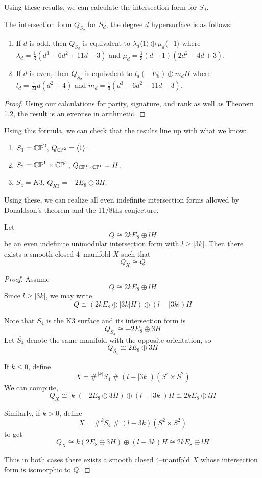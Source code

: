 \documentclass[12pt]{article}
\begin{document}
Using these results, we can calculate the intersection form for $S_d$. 
\begin{theorem}
    The intersection form $Q_{S_d}$ for $S_d$, the degree $d$ hypersurface is as follows: 
    \begin{enumerate}
        \item If $d$ is odd, then $Q_{S_d}$ is equivalent to $\lambda_d\langle 1 \rangle \oplus \mu_d\langle -1 \rangle$ where $\lambda_d = \frac{1}{3}(d^3 - 6d^2 + 11d - 3)$ and $\mu_d = \frac{1}{3}(d-1)(2d^2 - 4d+3)$.
        \item If $d$ is even, then $Q_{S_d}$ is equivalent to $l_d(-E_8) \oplus m_dH$ where $l_d = \frac{1}{24}d(d^2-4)$ and $m_d = \frac{1}{3}(d^3 - 6d^2 + 11d -3)$.
    \end{enumerate}     
\end{theorem}
\begin{proof}
    Using our calculations for parity, signature, and rank as well as Theorem 1.2, the result is an exercise in arithmetic. 
\end{proof}

Using this formula, we can check that the results line up with what we know:
\begin{enumerate}
    \item $S_1 = \mathbb{CP}^2$, $Q_{\mathbb{CP}^2} = \langle 1 \rangle$. 
    \item $S_2 = \mathbb{CP}^1 \times \mathbb{CP}^1$, $Q_{\mathbb{CP}^1 \times \mathbb{CP}^1} = H$.
    \item $S_4 = K3$, $Q_{K3} = -2E_8 \oplus 3H$. 
\end{enumerate}

Using these, we can realize all even indefinite intersection forms allowed by Donaldson's theorem and the 11/8ths conjecture. 

\begin{theorem}
Let 
\[ Q \cong 2kE_8 \oplus lH \]
be an even indefinite unimodular intersection form with $l \ge |3k|$. Then there exists a smooth closed $4$–manifold $X$ such that
\[ Q_X \cong Q \]
\end{theorem}

\begin{proof}
Assume
\[ Q \cong 2kE_8 \oplus lH \]
Since $l \ge |3k|$, we may write
\[ Q \cong (2kE_8 \oplus |3k|H) \oplus (l-|3k|)H  \]

Note that $S_4$ is the K3 surface and its intersection form is
\[ Q_{S_4} \cong -2E_8 \oplus 3H  \]
Let $\overline{S_4}$ denote the same manifold with the opposite orientation, so
\[ Q_{\overline{S_4}} \cong 2E_8 \oplus 3H \]

If $k \le 0$, define
\[ X = \#^{\,|k|} S_4 \;\#\; (l-|3k|)(S^2 \times S^2) \]
We can compute,
\[ Q_X \cong |k|(-2E_8 \oplus 3H) \oplus (l-|3k|)H \cong 2kE_8 \oplus lH \]

Similarly, if $k>0$, define
\[ X = \#^{\,k} \overline{S_4} \;\#\; (l-3k)(S^2 \times S^2) \]
to get
\[ Q_X \cong k(2E_8 \oplus 3H) \oplus (l-3k)H \cong 2kE_8 \oplus lH \]

Thus in both cases there exists a smooth closed $4$–manifold $X$ whose intersection form is isomorphic to $Q$.
\end{proof}
\end{document}
